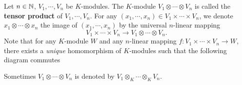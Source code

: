 \begin{definitionenv}
    Let $n\in \mathbb{N}$, $V_1,\cdots, V_n$ be $K$-modules.
    The $K$-module $V_1\otimes \cdots \otimes V_n$ is called the \textbf{tensor product} of $V_1,\cdots, V_n$.
    For any $(x_1,\cdots,x_n) \in V_1\times \cdots \times V_n$, we denote $x_1\otimes \cdots \otimes x_n$ the image of $(x_1,\cdots,x_n)$ by the universal $n$-linear mapping
    $$ V_1\times \cdots \times V_n \rightarrow V_1\otimes \cdots \otimes V_n.$$
    Note that for any $K$-module $W$ and any $n$-linear mapping $f: V_1\times \cdots \times V_n \rightarrow W$, there exists a \textit{unique} homomorphism of $K$-modules such that the following diagram commutes
    \begin{center}
    \end{center}

Sometimes $V_1 \otimes \cdots \otimes V_n$ is denoted by $V_1 \otimes_{K} \cdots \otimes_{K} V_n$.
\end{definitionenv}

